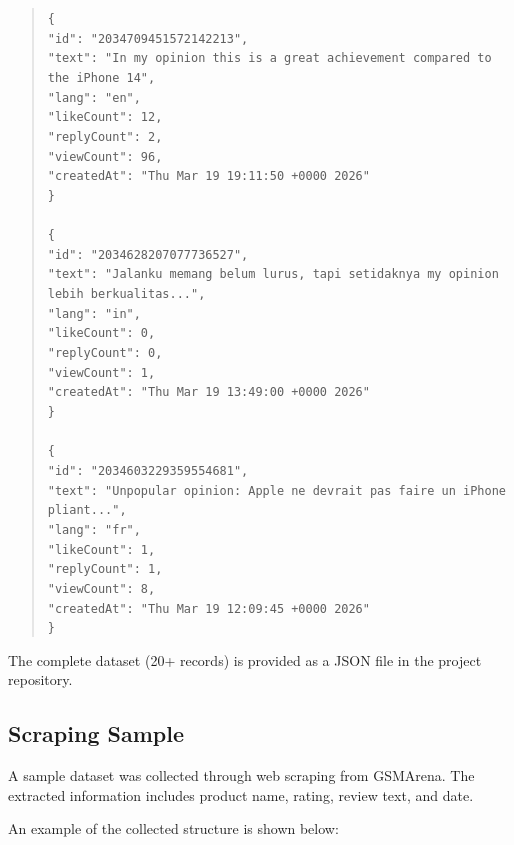 \documentclass[12pt]{article}
\begin{document}
\begin{quote}
\texttt{\{ \\
"id": "2034709451572142213", \\
"text": "In my opinion this is a great achievement compared to the iPhone 14", \\
"lang": "en", \\
"likeCount": 12, \\
"replyCount": 2, \\
"viewCount": 96, \\
"createdAt": "Thu Mar 19 19:11:50 +0000 2026" \\
\}} \\
\\
\texttt{\{ \\
"id": "2034628207077736527", \\
"text": "Jalanku memang belum lurus, tapi setidaknya my opinion lebih berkualitas...", \\
"lang": "in", \\
"likeCount": 0, \\
"replyCount": 0, \\
"viewCount": 1, \\
"createdAt": "Thu Mar 19 13:49:00 +0000 2026" \\
\}} \\
\\
\texttt{\{ \\
"id": "2034603229359554681", \\
"text": "Unpopular opinion: Apple ne devrait pas faire un iPhone pliant...", \\
"lang": "fr", \\
"likeCount": 1, \\
"replyCount": 1, \\
"viewCount": 8, \\
"createdAt": "Thu Mar 19 12:09:45 +0000 2026" \\
\}}
\end{quote}

The complete dataset (20+ records) is provided as a JSON file in the project repository.

\subsection{Scraping Sample}
A sample dataset was collected through web scraping from GSMArena. The extracted information includes product name, rating, review text, and date.

An example of the collected structure is shown below:
\end{document}
